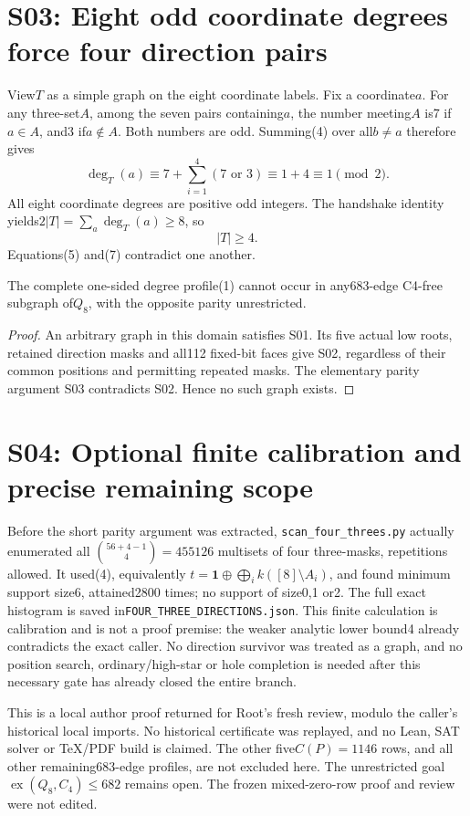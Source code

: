 \documentclass{article}
\begin{document}
\section{S03: Eight odd coordinate degrees force four direction pairs}
View$T$ as a simple graph on the eight coordinate labels. Fix a
coordinate$a$. For any three-set$A$, among the seven pairs containing$a$,
the number meeting$A$ is7 if$a\in A$, and3 if$a\notin A$.
Both numbers are odd. Summing(4) over all$b\ne a$ therefore gives
\[
 \deg_T(a)\equiv7+\sum_{i=1}^4(7\text{ or }3)
              \equiv1+4\equiv1\pmod2.                  \tag{6}
\]
All eight coordinate degrees are positive odd integers. The handshake
identity yields$2|T|=\sum_a\deg_T(a)\ge8$, so
\[
                             |T|\ge4.                  \tag{7}
\]
Equations(5) and(7) contradict one another.

\begin{theorem}
The complete one-sided degree profile(1) cannot occur in any683-edge
C4-free subgraph of$Q_8$, with the opposite parity unrestricted.
\end{theorem}
\begin{proof}
An arbitrary graph in this domain satisfies S01. Its five actual low
roots, retained direction masks and all112 fixed-bit faces give S02,
regardless of their common positions and permitting repeated masks.
The elementary parity argument S03 contradicts S02. Hence no such graph
exists.
\end{proof}

\section{S04: Optional finite calibration and precise remaining scope}
Before the short parity argument was extracted,
\texttt{scan\_four\_threes.py} actually enumerated all
$\binom{56+4-1}4=455126$ multisets of four three-masks, repetitions
allowed. It used(4), equivalently
$t=\mathbf1\oplus\bigoplus_i k([8]\setminus A_i)$, and found
minimum support size6, attained2800 times; no support of size0,1 or2.
The full exact histogram is saved in\texttt{FOUR\_THREE\_DIRECTIONS.json}.
This finite calculation is calibration and is not a proof premise:
the weaker analytic lower bound4 already contradicts the exact caller.
No direction survivor was treated as a graph, and no position search,
ordinary/high-star or hole completion is needed after this necessary
gate has already closed the entire branch.

This is a local author proof returned for Root's fresh review, modulo
the caller's historical local imports. No historical certificate was
replayed, and no Lean, SAT solver or TeX/PDF build is claimed. The other
five$C(P)=1146$ rows, and all other remaining683-edge profiles, are not
excluded here. The unrestricted goal$\operatorname{ex}(Q_8,C_4)\le682$
remains open. The frozen mixed-zero-row proof and review were not edited.
\end{document}
